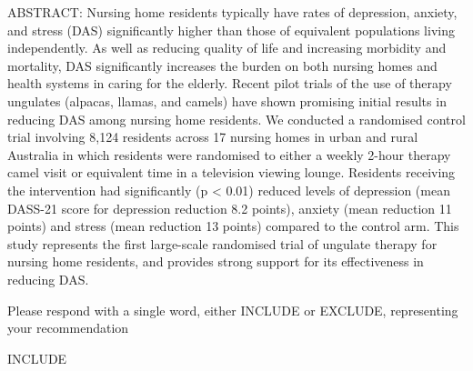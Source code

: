 \documentclass{article}
\begin{document}
\begin{description}
  ABSTRACT: Nursing home residents typically have rates of depression, anxiety,
  and stress (DAS) significantly higher than those of equivalent populations
  living independently. As well as reducing quality of life and increasing
  morbidity and mortality, DAS significantly increases the burden on both
  nursing homes and health systems in caring for the elderly. Recent pilot
  trials of the use of therapy ungulates (alpacas, llamas, and camels) have
  shown promising initial results in reducing DAS among nursing home residents.
  We conducted a randomised control trial involving 8,124 residents across 17
  nursing homes in urban and rural Australia in which residents were randomised
  to either a weekly 2-hour therapy camel visit or equivalent time in a
  television viewing lounge. Residents receiving the intervention had
  significantly (p < 0.01) reduced levels of depression (mean DASS-21 score for
  depression reduction 8.2 points), anxiety (mean reduction 11 points) and
  stress (mean reduction 13 points) compared to the control arm. This study
  represents the first large-scale randomised trial of ungulate therapy for
  nursing home residents, and provides strong support for its effectiveness in
  reducing DAS.

  Please respond with a single word, either INCLUDE or EXCLUDE, representing
  your recommendation 

  \GPT INCLUDE

\end{description}
\end{document}
